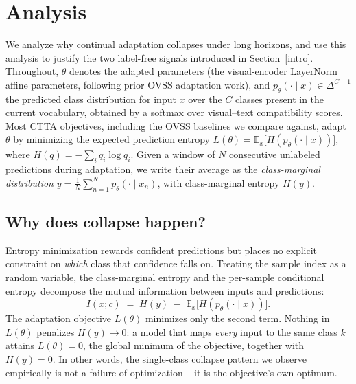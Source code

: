 
\section{Analysis} \label{analysis}

We analyze why continual adaptation collapses under long horizons, and use this
analysis to justify the two label-free signals introduced in
Section~\ref{intro}. Throughout, $\theta$ denotes the adapted parameters
(the visual-encoder LayerNorm affine parameters, following prior OVSS
adaptation work), and $p_\theta(\cdot \mid x) \in \Delta^{C-1}$ the predicted
class distribution for input $x$ over the $C$ classes present in the current
vocabulary, obtained by a softmax over visual--text compatibility scores.
Most CTTA objectives, including the OVSS baselines we compare against, adapt
$\theta$ by minimizing the expected prediction entropy
$L(\theta) = \mathbb{E}_x\big[H(p_\theta(\cdot\mid x))\big]$, where
$H(q) = -\sum_i q_i \log q_i$. Given a window of $N$ consecutive unlabeled
predictions during adaptation, we write their average as the
\emph{class-marginal distribution}
$\bar y = \frac1N\sum_{n=1}^N p_\theta(\cdot \mid x_n)$, with class-marginal
entropy $H(\bar y)$.

\subsection{Why does collapse happen?} \label{sec:why-collapse}

Entropy minimization rewards confident predictions but places no explicit
constraint on \emph{which} class that confidence falls on. Treating the
sample index as a random variable, the class-marginal entropy and the
per-sample conditional entropy decompose the mutual information between
inputs and predictions:
\begin{equation}
I(x; c) \;=\; H(\bar y) \;-\; \mathbb{E}_x\big[H(p_\theta(\cdot\mid x))\big].
\label{eq:mi-decomp}
\end{equation}
The adaptation objective $L(\theta)$ minimizes only the second term. Nothing
in $L(\theta)$ penalizes $H(\bar y) \to 0$: a model that maps \emph{every}
input to the same class $k$ attains $L(\theta) = 0$, the global minimum of the
objective, together with $H(\bar y) = 0$. In other words, the single-class
collapse pattern we observe empirically is not a failure of optimization --
it is the objective's own optimum.

